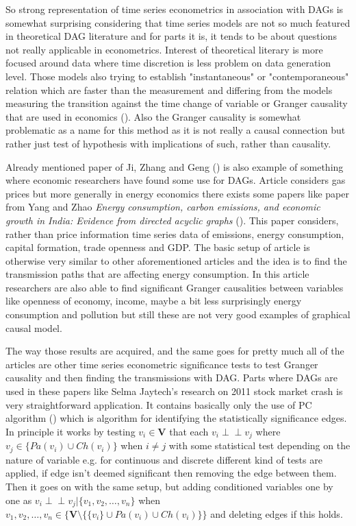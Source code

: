 \documentclass[main=english,12pt,a4paper,pdftex,econ,utf8]{aaltothesis}
\newcommand{\indep}{\perp \!\!\! \perp}
\newcommand{\ch}[1]{Ch(#1)}
\newcommand{\pa}[1]{Pa(#1)}
\newcommand{\vars}{\bm{V}}
\begin{document}
So strong representation of time series econometrics in association with DAGs is somewhat surprising considering that time series models are not so much featured in theoretical DAG literature and for parts it is, it tends to be about questions not really applicable in econometrics. Interest of theoretical literary is more focused around data where time discretion is less problem on data generation level. Those models also trying to establish "instantaneous" or "contemporaneous" relation which are faster than the measurement and differing from the models measuring the transition against the time change of variable or Granger causality that are used in economics (\cite{Hyttinen2017}). Also the Granger causality is somewhat problematic as a name for this method as it is not really a causal connection but rather just test of hypothesis with implications of such, rather than causality.

Already mentioned paper of Ji, Zhang and Geng (\cite{Ji2018}) is also example of something where economic researchers have found some use for DAGs. Article considers gas prices but more generally in energy economics there exists some papers like paper from Yang and Zhao \textit{Energy consumption, carbon emissions, and economic growth in India: Evidence from directed acyclic graphs} (\cite{Yang2014}). This paper considers, rather than price information time series data of emissions, energy consumption, capital formation, trade openness and GDP. The basic setup of article is otherwise very similar to other aforementioned articles and the idea is to find the transmission paths that are affecting energy consumption. In this article researchers are also able to find significant Granger causalities between variables like openness of economy, income, maybe a bit less surprisingly energy consumption and pollution but still these are not very good examples of graphical causal model.

The way those results are acquired, and the same goes for pretty much all of the articles are other time series econometric significance tests to test Granger causality and then finding the transmissions with DAG. Parts where DAGs are used in these papers like Selma Jaytech's research on 2011 stock market crash is very straightforward application. It contains basically only the use of PC algorithm (\cite{Spirtes2000}) which is algorithm for identifying the statistically significance edges. In principle it works by testing $v_{i}\in\vars$ that each $v_{i}\indep v_{j}$ where $v_{j}\in\{\pa{v_{i}}\cup\ch{v_{i}}\}$ when $i\neq j$ with some statistical test depending on the nature of variable e.g. for continuous and discrete different kind of tests are applied, if edge isn't deemed significant then removing the edge between them. Then it goes on with the same setup, but adding conditioned variables one by one as $v_{i}\indep v_{j}|\{v_{1},v_{2},\ldots,v_{n}\}$ when $v_{1},v_{2},\ldots,v_{n}\in\{\vars\setminus\{\{v_{i}\}\cup\pa{v_{i}}\cup\ch{v_{i}}\}\}$ and deleting edges if this holds. 
\end{document}
